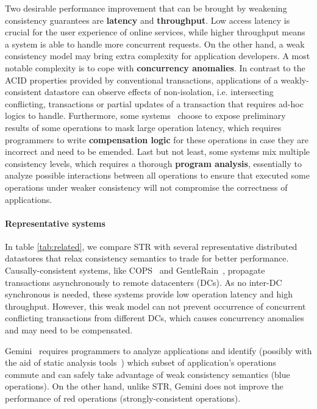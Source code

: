 Two desirable performance improvement that can be brought by weakening consistency guarantees are \textbf{latency} and \textbf{throughput}. Low access latency is crucial for the user experience of online services, while higher throughput means a system is able to handle more concurrent requests. On the other hand, a weak consistency model may bring extra complexity for application developers. A most notable complexity is to cope with \textbf{concurrency anomalies}. In contrast to the ACID properties provided by conventional transactions, applications of a weakly-consistent datastore can observe effects of non-isolation, i.e. intersecting conflicting, transactions or partial updates of a transaction that requires ad-hoc logics to handle. Furthermore, some systems~\cite{helland2009building, icg, pang2014planet} choose to expose preliminary results of some operations to mask large operation latency, which requires programmers to write \textbf{compensation logic} for these operations in case they are incorrect and need to be emended. Last but not least, some systems mix multiple consistency levels, which requires a thorough \textbf{program analysis}, essentially to analyze possible interactions between all operations to ensure that executed some operations under weaker consistency will not compromise the correctness of applications.

\paragraph{Representative systems} In table \ref{tab:related}, we compare STR with several representative distributed datastores that relax consistency semantics to trade for better performance. Causally-consistent systems, like COPS~\cite{lloyd2011don} and GentleRain~\cite{du2014gentlerain}, propagate transactions asynchronously to remote datacenters (DCs). As no inter-DC synchronous is needed, these systems provide low operation latency and high throughput. However, this weak model can not prevent occurrence of concurrent conflicting transactions from different DCs, which causes concurrency anomalies and may need to be compensated.

Gemini~\cite{li2012making} requires programmers to analyze applications and identify (possibly with the aid of static analysis tools~\cite{atc-rodrigo}) which subset of application's operations commute and can safely take advantage of weak consistency semantics (blue operations). On the other hand, unlike STR, Gemini does not improve the performance of red operations (strongly-consistent operations).


